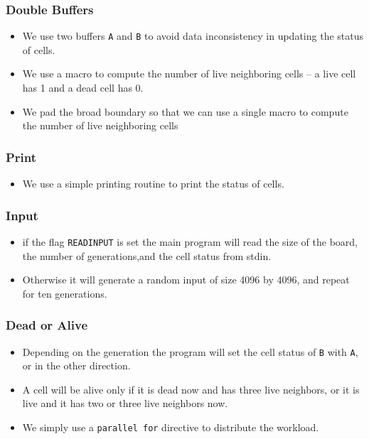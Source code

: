 \documentclass{beamer}
\begin{document}
\begin{frame}
\frametitle{Double Buffers}
\begin{itemize}
\item We use two buffers {\tt A} and {\tt B} to avoid data
  inconsistency in updating the status of cells.
\item We use a macro to compute the number of live neighboring cells
  -- a live cell has 1 and a dead cell has 0.
\item We pad the broad boundary so that we can use a single macro to
  compute the number of live neighboring cells
\end{itemize}
\end{frame}

\begin{frame}
\end{frame}

\begin{frame}
\frametitle{Print}
\begin{itemize}
\item We use a simple printing routine to print the status of cells.
\end{itemize}
\end{frame}

\begin{frame}
\end{frame}

\begin{frame}
\frametitle{Input}
\begin{itemize}
\item if the flag {\tt READINPUT} is set the main program will read the
  size of the board, the number of generations,and the cell status
  from stdin.  
\item Otherwise it will generate a random input of size 4096 by 4096,
  and repeat for ten generations.
\end{itemize}
\end{frame}

\begin{frame}
\end{frame}

\begin{frame}
\frametitle{Dead or Alive}
\begin{itemize}
\item Depending on the generation the program will set the cell status
  of {\tt B} with {\tt A}, or in the other direction.
\item A cell will be alive only if it is dead now and has three live
  neighbors, or it is live and it has two or three live neighbors now.
\item We simply use a {\tt parallel for} directive to distribute the
  workload.
\end{itemize}
\end{frame}
\end{document}
